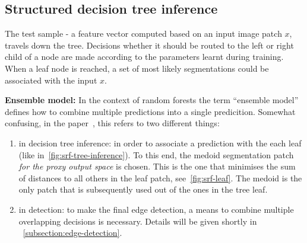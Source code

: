 \subsection{Structured decision tree inference}
The test sample - a feature vector computed based on an input image patch $x$, travels down the tree. Decisions whether it should be routed to the left or right child of a node are made according to the parameters learnt during training. When a leaf node is reached, a set of most likely segmentations could be associated with the input $x$.

\textbf{Ensemble model:} In the context of random forests the term ``ensemble model'' defines how to combine multiple predictions into a single predicition. Somewhat confusing, in the paper~\cite{DollarICCV13edges}, this refers to two different things:
\begin{enumerate}
 \item{in decision tree inference:} in order to associate a prediction with the each leaf (like in~\ref{fig:srf-tree-inference}). To this end, the medoid segmentation patch \textit{for the proxy output space} is chosen. This is the one that minimises the sum of distances to all others in the leaf patch, see~\ref{fig:srf-leaf}. The medoid is the only patch that is subsequently used out of the ones in the tree leaf.
 \item{in detection:} to make the final edge detection, a means to combine multiple overlapping decisions is necessary. Details will be given shortly in \textsection~\ref{subsection:edge-detection}.
\end{enumerate}

